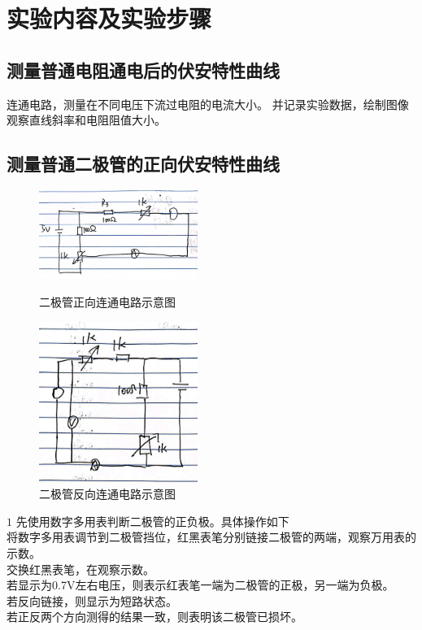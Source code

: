 \documentclass{ctexart}
\begin{document}
\section{实验内容及实验步骤}
  \subsection{测量普通电阻通电后的伏安特性曲线}
  连通电路，测量在不同电压下流过电阻的电流大小。
  并记录实验数据，绘制图像观察直线斜率和电阻阻值大小。

  \subsection{测量普通二极管的正向伏安特性曲线}
  \begin{figure}[b]
    \centering
    \begin{minipage}[b]{0.48\textwidth}
      \centering
      \includegraphics[width=0.46\textwidth]{zhengxiangdianlu.jpg}
      \caption{二极管正向连通电路示意图}\label{zhengxiangdianlu}
    \end{minipage}
    \begin{minipage}[b]{0.48\textwidth}
      \centering
      \includegraphics[width=0.46\textwidth]{fanxiangdianlu.jpg}
      \caption{二极管反向连通电路示意图}\label{fanxiangdianlu}
    \end{minipage}
  \end{figure}

  \(1\) 先使用数字多用表判断二极管的正负极。具体操作如下\\
  将数字多用表调节到二极管挡位，红黑表笔分别链接二极管的两端，观察万用表的示数。\\
  交换红黑表笔，在观察示数。\\
  若显示为0.7V左右电压，则表示红表笔一端为二极管的正极，另一端为负极。\\
  若反向链接，则显示为短路状态。\\
  若正反两个方向测得的结果一致，则表明该二极管已损坏。
\end{document}
